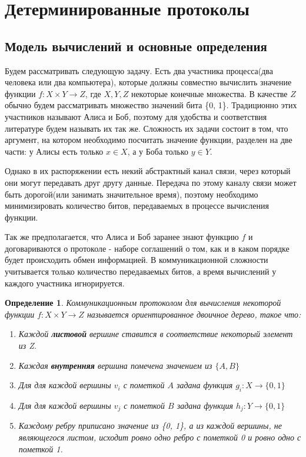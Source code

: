 \documentclass[12pt]{article}
\begin{document}
\tableofcontents
\newpage

\section{Детерминированные протоколы}
\subsection{Модель вычислений и основные определения}


\newtheorem{Def}{Определение}
\newtheorem{Statement}{Утверждение}
\newtheorem{Th}{Теорема}

Будем рассматривать следующую задачу.
Есть два участника процесса(два человека или два компьютера), которые должны совместно вычислить значение функции
$ f \colon X \times Y \rightarrow Z $, где $X, Y, Z$ некоторые конечные множества.
В качестве $Z$ обычно будем рассматривать множество значений бита \{0, 1\}.
Традиционно этих участников называют Алиса и Боб,
поэтому для удобства и соответствия литературе будем называть их так же.
Сложность их задачи состоит в том, что аргумент, на котором необходимо посчитать значение функции, разделен на две части:
у Алисы есть только $x \in X$, а у Боба только $y \in Y$.

Однако в их распоряжении есть некий абстрактный канал связи, через который они могут передавать друг другу данные. Передача по этому каналу связи может быть дорогой(или занимать значительное время), поэтому необходимо минимизировать количество битов, передаваемых в процессе вычисления функции.

Так же предполагается, что Алиса и Боб заранее знают функцию $f$ и договариваются о протоколе -
наборе соглашений о том, как и в каком порядке будет происходить обмен информацией. В коммуникационной сложности учитывается только количество передаваемых битов, а время вычислений у каждого участника игнорируется.

\begin{Def}
Коммуникационным протоколом для вычисления некоторой функции
$ f \colon X \times Y \rightarrow Z $
называется ориентированное двоичное дерево, такое что:
\begin{enumerate}
    \item
    Каждой \textbf{листовой} вершине ставится в соответствие некоторый элемент из Z.
    \item
    Каждая \textbf{внутренняя} вершина помечена значением из $ \{ A, B \} $
    \item
    Для для каждой вершины $v_i$ с пометкой $A$ задана функция \linebreak
    $ g_i \colon X \rightarrow \{0, 1\} $
    \item
    Для для каждой вершины $v_j$ с пометкой $B$ задана функция \linebreak
    $ h_j \colon Y \rightarrow \{0, 1\} $
    \item
    Каждому ребру приписано значение из \{0, 1\}, а из каждой вершины, не являющегося листом, исходит ровно одно ребро с пометкой 0 и ровно одно с пометкой 1.
\end{enumerate}
\end{Def}
\end{document}
